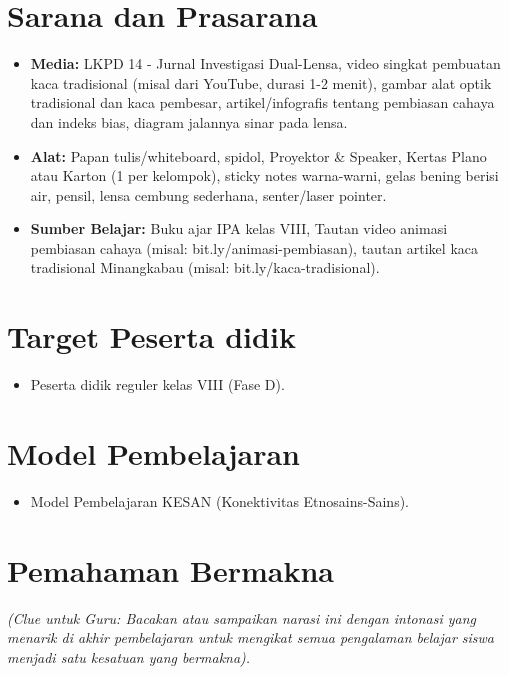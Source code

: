 \documentclass[12pt,a4paper]{article}
\begin{document}
\section{Sarana dan Prasarana}

\begin{itemize}
\item \textbf{Media:} LKPD 14 - Jurnal Investigasi Dual-Lensa, video singkat pembuatan kaca tradisional (misal dari YouTube, durasi 1-2 menit), gambar alat optik tradisional dan kaca pembesar, artikel/infografis tentang pembiasan cahaya dan indeks bias, diagram jalannya sinar pada lensa.
\item \textbf{Alat:} Papan tulis/whiteboard, spidol, Proyektor \& Speaker, Kertas Plano atau Karton (1 per kelompok), sticky notes warna-warni, gelas bening berisi air, pensil, lensa cembung sederhana, senter/laser pointer.
\item \textbf{Sumber Belajar:} Buku ajar IPA kelas VIII, Tautan video animasi pembiasan cahaya (misal: bit.ly/animasi-pembiasan), tautan artikel kaca tradisional Minangkabau (misal: bit.ly/kaca-tradisional).
\end{itemize}

\section{Target Peserta didik}

\begin{itemize}
\item Peserta didik reguler kelas VIII (Fase D).
\end{itemize}

\section{Model Pembelajaran}

\begin{itemize}
\item Model Pembelajaran KESAN (Konektivitas Etnosains-Sains).
\end{itemize}

\section{Pemahaman Bermakna}
\textit{(Clue untuk Guru: Bacakan atau sampaikan narasi ini dengan intonasi yang menarik di akhir pembelajaran untuk mengikat semua pengalaman belajar siswa menjadi satu kesatuan yang bermakna).}
\end{document}
